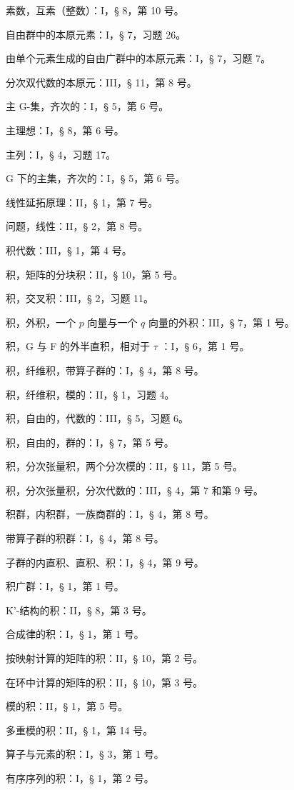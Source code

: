 素数，互素（整数）：I，§ 8，第 10 号。

自由群中的本原元素：I，§ 7，习题 26。

由单个元素生成的自由广群中的本原元素：I，§ 7，习题 7。

分次双代数的本原元：III，§ 11，第 8 号。

主 G-集，齐次的：I，§ 5，第 6 号。

主理想：I，§ 8，第 6 号。

主列：I，§ 4，习题 17。

G 下的主集，齐次的：I，§ 5，第 6 号。

线性延拓原理：II，§ 1，第 7 号。

问题，线性：II，§ 2，第 8 号。

积代数：III，§ 1，第 4 号。

积，矩阵的分块积：II，§ 10，第 5 号。

积，交叉积：III，§ 2，习题 11。

积，外积，一个 \(p\) 向量与一个 \(q\) 向量的外积：III，§ 7，第 1 号。

积，G 与 F 的外半直积，相对于 \(\tau\) ：I，§ 6，第 1 号。

积，纤维积，带算子群的：I，§ 4，第 8 号。

积，纤维积，模的：II，§ 1，习题 4。

积，自由的，代数的：III，§ 5，习题 6。

积，自由的，群的：I，§ 7，第 5 号。

积，分次张量积，两个分次模的：II，§ 11，第 5 号。

积，分次张量积，分次代数的：III，§ 4，第 7 和第 9 号。

积群，内积群，一族商群的：I，§ 4，第 8 号。

带算子群的积群：I，§ 4，第 8 号。

子群的内直积、直积、积：I，§ 4，第 9 号。

积广群：I，§ 1，第 1 号。

K'-结构的积：II，§ 8，第 3 号。

合成律的积：I，§ 1，第 1 号。

按映射计算的矩阵的积：II，§ 10，第 2 号。

在环中计算的矩阵的积：II，§ 10，第 3 号。

模的积：II，§ 1，第 5 号。

多重模的积：II，§ 1，第 14 号。

算子与元素的积：I，§ 3，第 1 号。

有序序列的积：I，§ 1，第 2 号。


